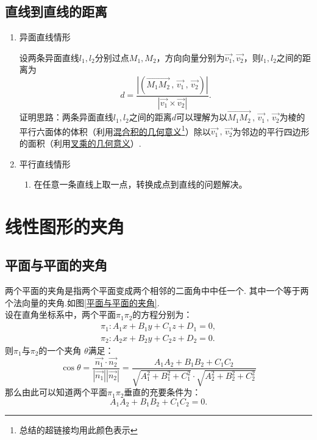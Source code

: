 \subsection{直线到直线的距离}
\begin{enumerate}[\large1.]
	\item {\color{dy}\large 异面直线情形}
	
	\enbelowtheorem[异面直线的距离]
	\quad 设两条异面直线$l_1,l_2$分别过点$M_1,M_2$，方向向量分别为$\overrightarrow{v_1},\overrightarrow{v_2}$，则$l_1,l_2$之间的距离为
	\begin{equation}
	d=\frac{\left| \left( \overrightarrow{M_1M_2}\,,\,\overrightarrow{v_1}\,,\,\overrightarrow{v_2}\right) \right| }{\left| \overrightarrow{v_1} \times \overrightarrow{v_2}\right|}.
	\end{equation}
	证明思路：两条异面直线$l_1,l_2$之间的距离$d$可以理解为以$\overrightarrow{M_1M_2}\,,\,\overrightarrow{v_1}\,,\,\overrightarrow{v_2}$为棱的平行六面体的体积（利用\hyperref[混合积的几何意义]{\color{超链接}混合积的几何意义}\footnote{总结的超链接均用{\color{超链接}此颜色}表示}）除以$\overrightarrow{v_1}\,,\,\overrightarrow{v_2}$为邻边的平行四边形的面积（利用\hyperref[外积的几何意义]{\color{超链接}叉乘的几何意义}）.
	
	
	\item {\color{dy}\large 平行直线情形}
	\begin{enumerate}[]
		\item 在任意一条直线上取一点，转换成点到直线的问题解决。
	\end{enumerate}
\end{enumerate}

\section{线性图形的夹角}
\subsection{平面与平面的夹角}
\quad 两个{\color{dy}平面的夹角}是指两个平面变成两个相邻的二面角中中任一个. 其中一个等于两个法向量的夹角.如图\ref{平面与平面的夹角}.\\

\theorem[平面与平面的夹角]
\quad 设在{\color{dy}直角坐标系}中，两个平面$\pi_1 \pi_2$的方程分别为：
\begin{equation*}
\begin{array}{c}
\pi_1:A_1x+B_1y+C_1z+D_1=0,\\
\pi_2:A_2x+B_2y+C_2z+D_2=0.
\end{array}
\end{equation*}
则$\pi_1$与$ \pi_2$的一个夹角 $\theta $满足：
\begin{equation}
\cos \theta =\frac{\overrightarrow{n_1}\cdot \overrightarrow{n_2}}{\left| \overrightarrow{n_1}\right| \left|  \overrightarrow{n_2}\right| }
=\frac{A_1A_2+B_1B_2+C_1C_2}{\sqrt{A_1^2+B_1^2+C_1^2}\cdot \sqrt{A_2^2+B_2^2+C_2^2}}
\end{equation}
那么由此可以知道两个平面$\pi_1 \pi_2$垂直的充要条件为：
\begin{equation}
A_1A_2+B_1B_2+C_1C_2=0.
\end{equation}


